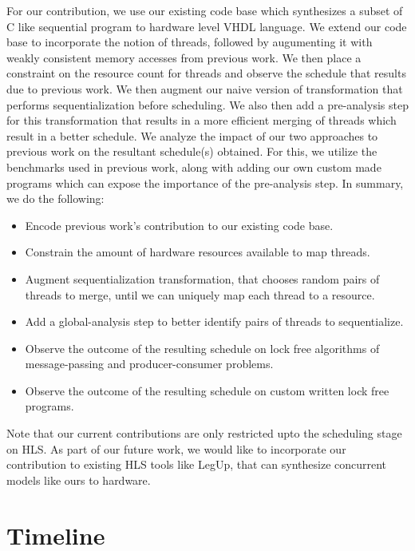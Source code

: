 \documentclass[sigplan,10pt,review]{acmart}
\begin{document}
        For our contribution, we use our existing code base which synthesizes a subset of C like sequential program to hardware level VHDL language. 
        We extend our code base to incorporate the notion of threads, followed by augumenting it with weakly consistent memory accesses from previous work. 
        We then place a constraint on the resource count for threads and observe the schedule that results due to previous work. 
        We then augment our naive version of transformation that performs sequentialization before scheduling.
        We also then add a pre-analysis step for this transformation that results in a more efficient merging of threads which result in a better schedule.  
        We analyze the impact of our two approaches to previous work on the resultant schedule(s) obtained.
        For this, we utilize the benchmarks used in previous work, along with adding our own custom made programs which can expose the importance of the pre-analysis step.  
        In summary, we do the following:
        \begin{itemize}
            \item Encode previous work's contribution to our existing code base.
            \item Constrain the amount of hardware resources available to map threads. 
            \item Augment sequentialization transformation, that chooses random pairs of threads to merge, until we can uniquely map each thread to a resource.
            \item Add a global-analysis step to better identify pairs of threads to sequentialize.
            \item Observe the outcome of the resulting schedule on lock free algorithms of message-passing and producer-consumer problems.
            \item Observe the outcome of the resulting schedule on custom written lock free programs.  
        \end{itemize}

        Note that our current contributions are only restricted upto the scheduling stage on HLS.
        As part of our future work, we would like to incorporate our contribution to existing HLS tools like LegUp, that can synthesize concurrent models like ours to hardware.

    \section{Timeline}
\end{document}
